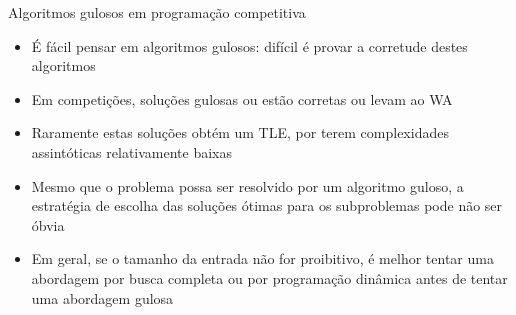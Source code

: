 \begin{frame}[fragile]{Algoritmos gulosos em programação competitiva}

    \begin{itemize}
        \item É fácil pensar em algoritmos gulosos: difícil é provar a corretude destes algoritmos

        \item Em competições, soluções gulosas ou estão corretas ou levam ao WA

        \item Raramente estas soluções obtém um TLE, por terem complexidades assintóticas relativamente baixas

        \item Mesmo que o problema possa ser resolvido por um algoritmo guloso, a estratégia 
            de escolha das soluções ótimas para os subproblemas pode não ser óbvia

        \item Em geral, se o tamanho da entrada não for proibitivo, é melhor tentar uma abordagem
            por busca completa ou por programação dinâmica antes de tentar uma abordagem gulosa
    \end{itemize}

\end{frame}
